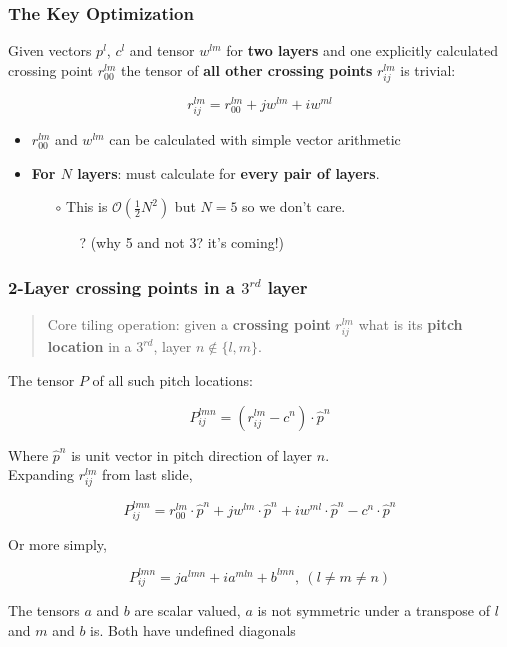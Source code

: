 \documentclass[xcolor=dvipsnames]{beamer}
\begin{document}
\begin{frame}
  \frametitle{The Key Optimization}
  Given vectors $p^l$, $c^l$ and tensor $w^{lm}$ for \textbf{two layers} and one explicitly calculated crossing point $r^{lm}_{00}$ the tensor of \textbf{all other crossing points} $r^{lm}_{ij}$ is trivial:
  \vspace{-5mm}
  \begin{center}
    \[r^{lm}_{ij} = r^{lm}_{00} + j w^{lm} + i w^{ml}\]
  \end{center}

  \begin{itemize}
  \item $r^{lm}_{00}$ and $w^{lm}$ can be calculated with simple vector arithmetic
  \item \textbf{For $N$ layers}: must calculate for \textbf{every pair of layers}.
    \begin{itemize}
    \item[$\circ$] This is $\mathcal{O}(\frac{1}{2}N^2)$ but $N=5$ so we don't care.
      \begin{itemize}\scriptsize
      \item[?]  (why 5 and not 3?  it's coming!)

      \end{itemize}
    \end{itemize}
  \end{itemize}
\end{frame}


\begin{frame}
  \frametitle{2-Layer crossing points in a $3^{rd}$ layer}
  \begin{quote}
    Core tiling operation: given a \textbf{crossing point} $r^{lm}_{ij}$ what is its \textbf{pitch location} in a $3^{rd}$, layer $n \not\in\{l,m\}$.
  \end{quote}
  The tensor $P$ of all such pitch locations:
  \vspace{-5mm}
  \begin{center}
    \[P^{lmn}_{ij} = (r^{lm}_{ij} - c^n) \cdot \hat{p}^n\]
  \end{center}

  Where $\hat{p}^n$ is unit vector in pitch direction of layer $n$.\\
  Expanding $r^{lm}_{ij}$ from last slide, 
  \vspace{-5mm}
  \begin{center}
    \[P^{lmn}_{ij} = r^{lm}_{00}\cdot \hat{p}^n + jw^{lm} \cdot \hat{p}^n + iw^{ml} \cdot \hat{p}^n - c^n \cdot \hat{p}^n\]
  \end{center}
  Or more simply,
  \vspace{-5mm}
  \begin{center}
    \[P^{lmn}_{ij} = ja^{lmn} + ia^{mln} + b^{lmn},\ (l \ne m \ne n)\]
  \end{center}
The tensors $a$ and $b$ are scalar valued, $a$ is not symmetric under a transpose of $l$ and $m$ and $b$ is.  Both have undefined diagonals

\end{frame}
\end{document}
